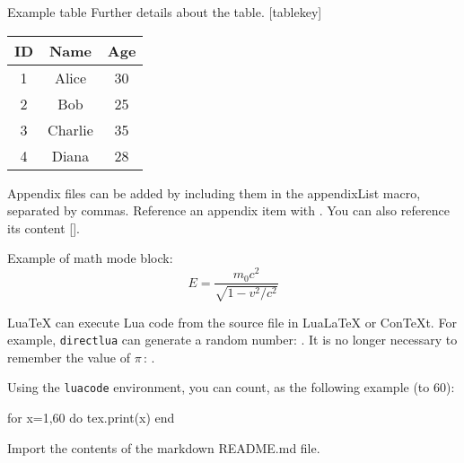 \begin{articleTableEnv}
    {Example table}
    {Further details about the table.}
    [tablekey]
    \begin{tabular}{|c|c|c|}
        \hline
        \textbf{ID} & \textbf{Name} & \textbf{Age} \\
        \hline
        1 & Alice & 30 \\
        2 & Bob & 25 \\
        3 & Charlie & 35 \\
        4 & Diana & 28 \\
        \hline
    \end{tabular}
\end{articleTableEnv}




Appendix files can be added by including them in the appendixList macro, separated by commas.
Reference an appendix item with . You can also reference its content [].


\lipsum[1][1-4]


Example of math mode block:
\begin{displaymath}
    E = \frac{m_{0} c^{2}}{\sqrt{1-v^{2}/c^{2}}}
\end{displaymath}



Lua\TeX{} can execute Lua code from the source file in Lua\LaTeX{} or Con\TeX{}t. For example, \texttt{directlua}
can generate a random number: .
It is no longer necessary to remember the value of $π$ :
.

Using the \texttt{luacode} environment, you can count, as the following example (to 60):
\begin{luacode}
  for x=1,60 do
    tex.print(x)
  end
\end{luacode}



Import the contents of the markdown README.md file.
\myInputREADME
